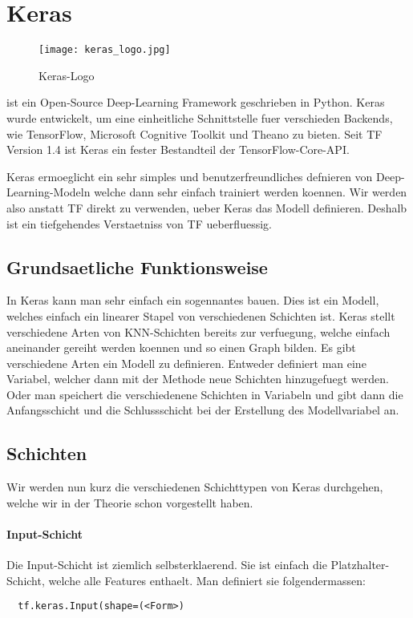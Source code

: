 \pagebreak
\section{Keras}
\begin{wrapfigure}{l}{3cm}
  \texttt{[image: keras\_logo.jpg]}
  \caption{Keras-Logo}
\end{wrapfigure}
 ist ein Open-Source Deep-Learning Framework geschrieben in
Python. Keras wurde entwickelt, um eine einheitliche Schnittstelle fuer
verschieden Backends, wie TensorFlow, Microsoft Cognitive Toolkit und Theano zu
bieten. Seit TF Version 1.4 ist Keras ein fester Bestandteil der TensorFlow-Core-API.

Keras ermoeglicht ein sehr simples und benutzerfreundliches defnieren von
Deep-Learning-Modeln welche dann sehr einfach trainiert werden koennen.
Wir werden also anstatt TF direkt zu verwenden, ueber Keras das Modell definieren.
Deshalb ist ein tiefgehendes Verstaetniss von TF ueberfluessig.

\subsection{Grundsaetliche Funktionsweise}
In Keras kann man sehr einfach ein sogennantes  bauen.
Dies ist ein Modell, welches einfach ein linearer Stapel von verschiedenen
Schichten ist. Keras stellt verschiedene Arten von KNN-Schichten bereits zur
verfuegung, welche einfach aneinander gereiht werden koennen und so einen Graph bilden.
\para{}
Es gibt verschiedene Arten ein Modell zu definieren. Entweder definiert man eine
 Variabel, welcher dann mit der Methode 
neue Schichten hinzugefuegt werden.
Oder man speichert die verschiedenene Schichten in Variabeln und gibt dann die
Anfangsschicht und die Schlussschicht bei der Erstellung des Modellvariabel an.

\subsection{Schichten}
Wir werden nun kurz die verschiedenen Schichttypen von Keras durchgehen, welche wir in
der Theorie schon vorgestellt haben.

\paragraph{Input-Schicht}
Die Input-Schicht ist ziemlich selbsterklaerend. Sie ist einfach die
Platzhalter-Schicht, welche alle Features enthaelt.
Man definiert sie folgendermassen:
\begin{verbatim}
  tf.keras.Input(shape=(<Form>)
\end{verbatim}

